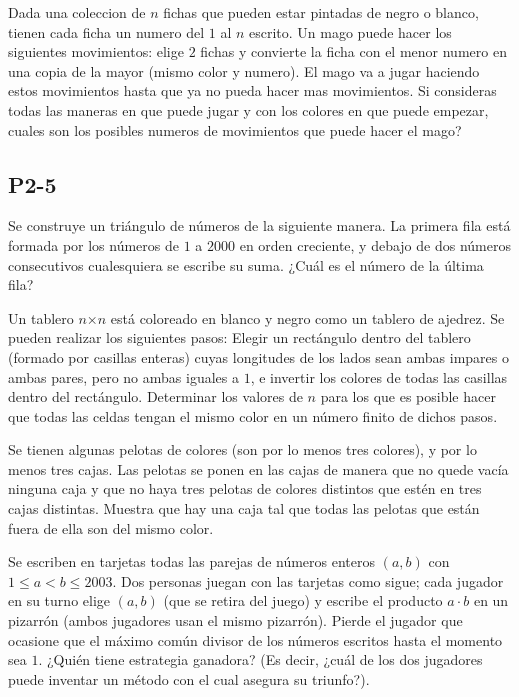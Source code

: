 \documentclass[11pt]{scrartcl}
\begin{document}
\begin{problem}[2023/4]
    Dada una coleccion de $n$ fichas que pueden estar pintadas de negro o blanco, tienen cada ficha un numero del $1$ al $n$ escrito. Un mago puede hacer los siguientes movimientos: elige $2$ fichas y convierte la ficha con el menor numero en una copia de la mayor (mismo color y numero).
El mago va a jugar haciendo estos movimientos hasta que ya no pueda hacer mas movimientos. 
Si consideras todas las maneras en que puede jugar y con los colores en que puede empezar, cuales son los posibles numeros de movimientos que puede hacer el mago?
\end{problem}
\subsection{P2-5}
\begin{problem}
    [2000/2]
    Se construye un triángulo de números de la siguiente manera. La primera fila está formada por los números de $1$ a $2000$ en orden creciente, y debajo de dos números consecutivos cualesquiera se escribe su suma. ¿Cuál es el número de la última fila? 
\end{problem}
\begin{problem}
    [2000/5]
    Un tablero $n$×$n$ está coloreado en blanco y negro como un tablero de ajedrez. Se pueden realizar los siguientes pasos: Elegir un rectángulo dentro del tablero (formado por casillas enteras) cuyas longitudes de los lados sean ambas impares o ambas pares, pero no ambas iguales a $1$, e invertir los colores de todas las casillas dentro del rectángulo. Determinar los valores de $n$ para los que es posible hacer que todas las celdas tengan el mismo color en un número finito de dichos pasos. 
\end{problem}
\begin{problem}
    [2001/2]
    Se tienen algunas pelotas de colores (son por lo menos tres colores), y por lo menos tres cajas. Las pelotas se ponen en las cajas de manera que no quede vacía ninguna caja y que no haya tres pelotas de colores distintos que estén en tres cajas distintas. Muestra que hay una caja tal que todas las pelotas que están fuera de ella son del mismo color.
\end{problem}
\begin{problem}
    [2003/5]
    Se escriben en tarjetas todas las parejas de números enteros $(a,b)$ con $1\leq a < b\leq 2003$. Dos personas juegan con las tarjetas como sigue; cada jugador en su turno elige $(a,b)$ (que se retira del juego) y escribe el producto $a\cdot b$ en un pizarrón (ambos jugadores usan el mismo pizarrón). Pierde el jugador que ocasione que el máximo común divisor de los números escritos hasta el momento sea $1$. ¿Quién tiene estrategia ganadora? (Es decir, ¿cuál de los dos jugadores puede inventar un método con el cual asegura su triunfo?). 
\end{problem}
\end{document}

